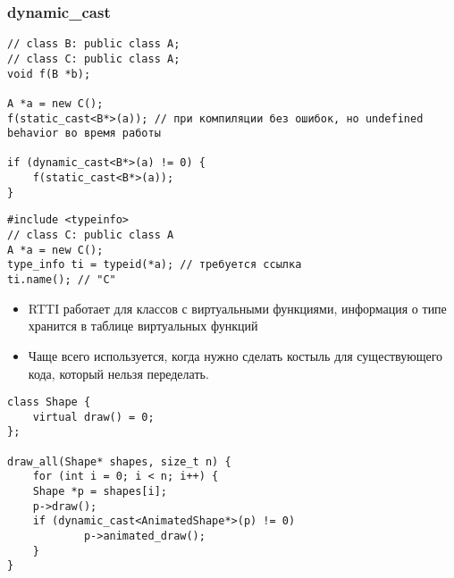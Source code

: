 \subsubsection{dynamic\_cast}
\begin{verbatim}
// class B: public class A;
// class C: public class A;
void f(B *b);

A *a = new C();
f(static_cast<B*>(a)); // при компиляции без ошибок, но undefined behavior во время работы

if (dynamic_cast<B*>(a) != 0) {
    f(static_cast<B*>(a));
}
\end{verbatim}
\begin{verbatim}
#include <typeinfo>
// class C: public class A
A *a = new C();
type_info ti = typeid(*a); // требуется ссылка
ti.name(); // "C"
\end{verbatim}
\begin{minipage}{0.35\textwidth}
\begin{itemize}[noitemsep]
    \item RTTI работает для классов с виртуальными функциями, информация о типе хранится в таблице виртуальных функций
    \item Чаще всего используется, когда нужно сделать костыль для существующего кода, который нельзя переделать. 
\end{itemize}
\end{minipage}
\hfill
\begin{minipage}{0.55\textwidth}
\begin{verbatim}
class Shape {
    virtual draw() = 0;
};

draw_all(Shape* shapes, size_t n) {
    for (int i = 0; i < n; i++) {
	Shape *p = shapes[i];
	p->draw();
	if (dynamic_cast<AnimatedShape*>(p) != 0) 
            p->animated_draw();
    }
}
\end{verbatim}
\end{minipage}
